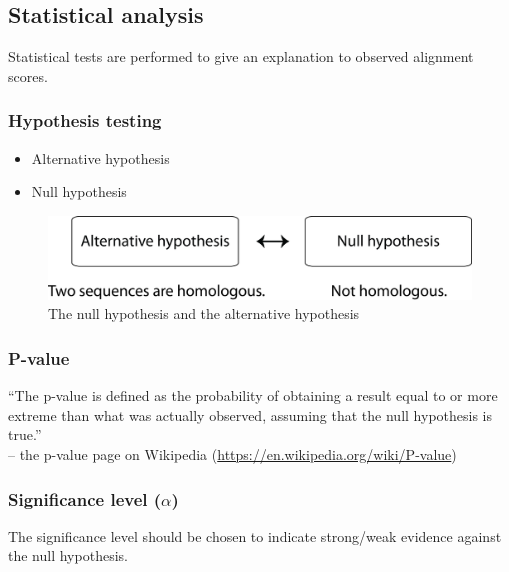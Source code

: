 %
%

%
%
\subsection{Statistical analysis}
Statistical tests are performed to give an explanation to observed alignment scores.

%
%
\subsubsection*{Hypothesis testing} 
\begin{itemize}
\item Alternative hypothesis
\item Null hypothesis
\end{itemize}

\begin{figure}[H]
  \centering
      \includegraphics[width=0.6 \textwidth]{fig06/hypotheses.png}
  \caption{The null hypothesis and the alternative hypothesis}
\end{figure}

%
%
\subsubsection*{P-value} 
``The p-value is defined as the probability of obtaining a result equal to or more extreme than what was actually observed, assuming that the null hypothesis is true.'' \\

\noindent
-- the p-value page on Wikipedia (\url{https://en.wikipedia.org/wiki/P-value})

%
%
\subsubsection*{Significance level ($\alpha$)} 
The significance level should be chosen to indicate strong/weak evidence against the null hypothesis. \\


